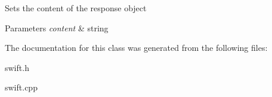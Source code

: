 Sets the content of the response object 
\begin{DoxyParams}{Parameters}
{\em content} & string \\
\hline
\end{DoxyParams}


The documentation for this class was generated from the following files\-:\begin{DoxyCompactItemize}
\item 
swift.\-h\item 
swift.\-cpp\end{DoxyCompactItemize}
